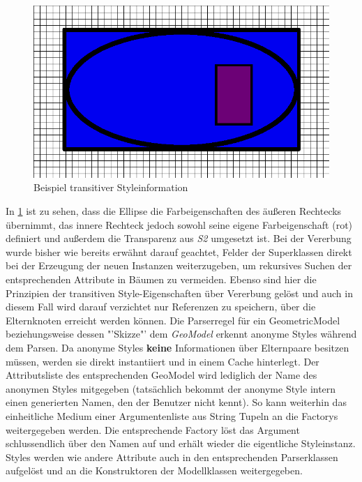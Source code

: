 \begin{figure}[H]
\begin{center}
\includegraphics[scale = 0.5]{Bilder/transitiveStyle.png}
\caption{Beispiel transitiver Styleinformation}
\label{transitiveStyleExample}
\end{center}
\end{figure}In \ref{transitiveStyleExample} ist zu sehen, dass die Ellipse die Farbeigenschaften des äußeren Rechtecks übernimmt, das innere Rechteck jedoch sowohl seine eigene Farbeigenschaft (rot) definiert und außerdem die Transparenz aus \textit{S2} umgesetzt ist.
Bei der Vererbung wurde bisher wie bereits erwähnt darauf geachtet, Felder der Superklassen direkt bei der Erzeugung der neuen Instanzen weiterzugeben, um rekursives Suchen der entsprechenden Attribute in Bäumen zu vermeiden. Ebenso sind hier die Prinzipien der transitiven Style-Eigenschaften über Vererbung gelöst und auch in diesem Fall wird darauf verzichtet nur Referenzen zu speichern, über die Elternknoten erreicht werden können.
Die Parserregel für ein GeometricModel beziehungsweise dessen "'Skizze"' dem \textit{GeoModel} erkennt anonyme Styles während dem Parsen. Da anonyme Styles \textbf{keine} Informationen über Elternpaare besitzen müssen, werden sie direkt instantiiert und in einem Cache hinterlegt. Der Attributsliste des entsprechenden GeoModel wird lediglich der Name des anonymen Styles mitgegeben (tatsächlich bekommt der anonyme Style intern einen generierten Namen, den der Benutzer nicht kennt). So kann weiterhin das einheitliche Medium einer Argumentenliste aus String Tupeln an die Factorys weitergegeben werden. Die entsprechende Factory löst das Argument schlussendlich über den Namen auf und erhält wieder die eigentliche Styleinstanz.
Styles werden wie andere Attribute auch in den entsprechenden Parserklassen aufgelöst und an die Konstruktoren der Modellklassen weitergegeben.
